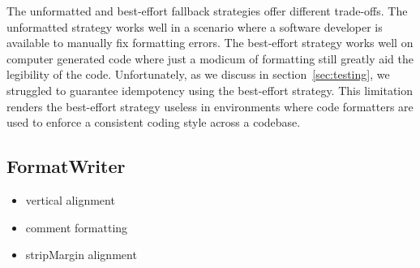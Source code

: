 The unformatted and best-effort fallback strategies offer different trade-offs.
The unformatted strategy works well in a scenario where a software developer is available to manually fix formatting errors.
The best-effort strategy works well on computer generated code where just a modicum of formatting still greatly aid the legibility of the code.
Unfortunately, as we discuss in section~\ref{sec:testing}, we struggled to guarantee idempotency using the best-effort strategy.
This limitation renders the best-effort strategy useless in environments where code formatters are used to enforce a consistent coding style across a codebase.


\subsection{FormatWriter}
\begin{itemize}
  \item vertical alignment
  \item comment formatting
  \item stripMargin alignment
\end{itemize}


